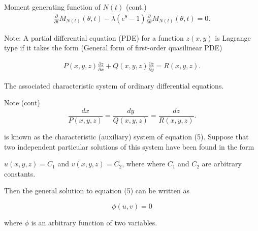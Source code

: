 \documentclass[12pt,ignorenonframetext,]{beamer}
\begin{document}
\begin{frame}{Moment generating function of \(N(t)\) (cont.)}
\protect\hypertarget{moment-generating-function-of-nt-cont.-3}{}
\begin{equation} \label{eq4}
\begin{split}
\frac{\partial}{\partial t}M_{N(t)}(\theta, t) - \lambda (e^{\theta} - 1)\frac{\partial}{\partial \theta}M_{N(t)}(\theta, t) = 0.
\end{split}
\end{equation}

\begin{block}{Note:}
\protect\hypertarget{note}{}
A partial differential equation (PDE) for a function \(z(x, y)\) is
Lagrange type if it takes the form (General form of first-order
quasilinear PDE)

\begin{equation} \label{eq5}
\begin{split}
P(x, y, z)\frac{\partial z}{\partial x} + Q(x, y, z) \frac{\partial z}{\partial y} = R(x, y, z).
\end{split}
\end{equation}

The associated characteristic system of ordinary differential equations.
\end{block}
\end{frame}

\begin{frame}
\begin{block}{Note (cont)}
\protect\hypertarget{note-cont}{}
\begin{equation} \label{eq5}
\frac{dx}{P(x, y, z)} = \frac{dy}{Q(x, y, z)}=\frac{dz}{R(x, y, z)}.
\end{equation}

is known as the characteristic (auxiliary) system of equation (5).
Suppose that two independent particular solutions of this system have
been found in the form

\(u(x, y, z) = C_1\) and \(v(x, y, z) = C_2\), where where \(C_1\) and
\(C_2\) are arbitrary constants.

Then the general solution to equation (5) can be written as

\begin{equation} \label{eq6}
\phi(u,v)=0
\end{equation}

where \(\phi\) is an arbitrary function of two variables.
\end{block}
\end{frame}
\end{document}

